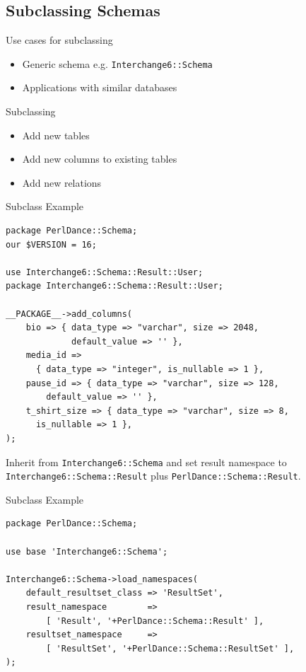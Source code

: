 \subsection{Subclassing Schemas}

\begin{frame}[fragile]{Use cases for subclassing}
\begin{itemize}
\item Generic schema e.g. \verb|Interchange6::Schema|
\item Applications with similar databases
\end{itemize}
\end{frame}

\begin{frame}{Subclassing}
\begin{itemize}
\item Add new tables
\item Add new columns to existing tables
\item Add new relations
\end{itemize}
\end{frame}

\begin{frame}[fragile]{Subclass Example}
\begin{lstlisting}
package PerlDance::Schema;
our $VERSION = 16;

use Interchange6::Schema::Result::User;
package Interchange6::Schema::Result::User;

__PACKAGE__->add_columns(
    bio => { data_type => "varchar", size => 2048, 
             default_value => '' },
    media_id =>
      { data_type => "integer", is_nullable => 1 },
    pause_id => { data_type => "varchar", size => 128, 
        default_value => '' },
    t_shirt_size => { data_type => "varchar", size => 8, 
      is_nullable => 1 },
);
\end{lstlisting}
\end{frame}

Inherit from \verb|Interchange6::Schema| and set result namespace to 
\verb|Interchange6::Schema::Result| plus \verb|PerlDance::Schema::Result|.

\begin{frame}[fragile]{Subclass Example}
\begin{lstlisting}
package PerlDance::Schema;

use base 'Interchange6::Schema';

Interchange6::Schema->load_namespaces(
    default_resultset_class => 'ResultSet',
    result_namespace        =>
        [ 'Result', '+PerlDance::Schema::Result' ],
    resultset_namespace     =>
        [ 'ResultSet', '+PerlDance::Schema::ResultSet' ],
);
\end{lstlisting}
\end{frame}



